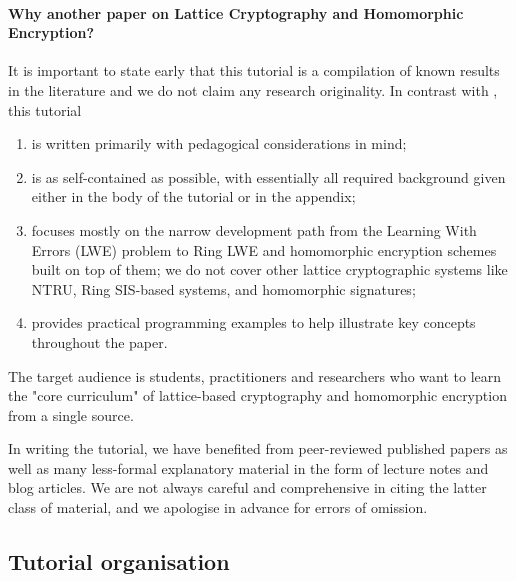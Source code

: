 \documentclass[../main.tex]{subfiles}
\begin{document}
\paragraph{Why another paper on Lattice Cryptography and Homomorphic Encryption?}
It is important to state early that this tutorial is a compilation of known results in the literature and we do not claim any research originality.
In contrast with \cite{peikert16decade, halevi2017homomorphic, chi15}, this tutorial 
\begin{enumerate}\itemsep1mm\parskip0mm
 \item is written primarily with pedagogical considerations in mind;
 \item is as self-contained as possible, with essentially all required background given either in the body of the tutorial or in the appendix;
 \item focuses mostly on the narrow development path from the Learning With Errors (LWE) problem to Ring LWE and homomorphic encryption schemes built on top of them; we do not cover other lattice cryptographic systems like NTRU, Ring SIS-based systems, and homomorphic signatures;
 \item provides practical programming examples to help illustrate key concepts throughout the paper. 
\end{enumerate}
The target audience is students, practitioners and researchers who want to learn the "core curriculum" of lattice-based cryptography and homomorphic encryption from a single source. %

In writing the tutorial, we have benefited from peer-reviewed published papers as well as many less-formal explanatory material in the form of lecture notes and blog articles.
We are not always careful and comprehensive in citing the latter class of material, and we apologise in advance for errors of omission. 



\subsection{Tutorial organisation}

\end{document}
